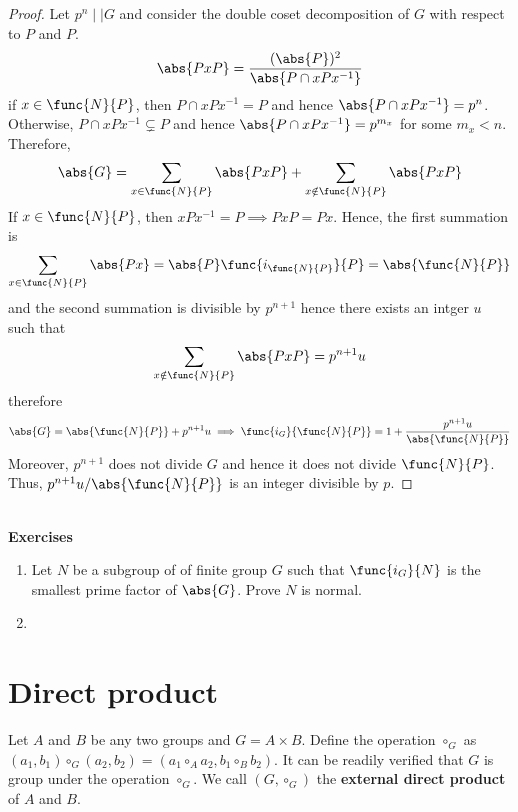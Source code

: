 \begin{proof}
    Let  \(p^n \mid\mid G\) and consider the double coset decomposition of \(G\) with respect to \(P\) and \(P\). 
    \begin{equation*}
        \abs{PxP} = \dfrac{(\abs{P})^2}{\abs{P \cap xPx^{-1}}}
    \end{equation*}
    if \(x \in \func{N}{P}\), then \(P \cap xPx^{-1} = P\) and hence \(\abs{P \cap xPx^{-1}} = p^n\). Otherwise, \(P \cap xPx^{-1} \subsetneq P\) and hence \(\abs{P \cap xPx^{-1}} = p^{m_x}\) for some \(m_x < n\). Therefore, 
    \begin{align*}
        \abs{G} = \sum_{x \in \func{N}{P}} \abs{PxP}  + \sum_{x \notin \func{N}{P}} \abs{PxP} 
    \end{align*}
    If \(x \in \func{N}{P}\), then \(xPx^{-1} = P \implies PxP = Px\). Hence, the first summation is 
    \begin{equation*}
        \sum_{x \in \func{N}{P}} \abs{Px}  = \abs{P} \func{i_{\func{N}{P}}}{P} = \abs{\func{N}{P}}
    \end{equation*}
    and the second summation is divisible by \(p^{n+1}\) hence there exists an intger \(u\) such that
    \begin{equation*}
        \sum_{x \notin \func{N}{P}} \abs{PxP} = p^{n+1}u
    \end{equation*}
    therefore 
    \begin{align*}
        \abs{G} = \abs{\func{N}{P}} + p^{n+1}u \implies \func{i_G}{\func{N}{P}} = 1 + \dfrac{p^{n+1} u}{ \abs{\func{N}{P}}}
    \end{align*}
    Moreover, \(p^{n+1}\) does not divide \(G\) and hence it does not divide \(\func{N}{P}\). Thus, \(p^{n+1} u /\abs{\func{N}{P}}\) is an integer divisible by 
    \(p\).
\end{proof}
\ \\ 
{\Large{\textbf{Exercises}}}
\begin{enumerate}
    \item Let \(N\) be a subgroup of of finite group \(G\) such that \(\func{i_G}{N}\) is the smallest prime factor of \(\abs{G}\). Prove \(N\) is normal.
    \item 
\end{enumerate}

\section{Direct product}
Let \(A\) and \(B\) be any two groups and \(G = A \times B\). Define the operation \(\circ_G\) as \((a_1,b_1) \circ_G (a_2,b_2) = (a_1\circ_A a_2, b_1 \circ_B b_2)\). It can be readily verified that \(G\) is group under the operation \(\circ_G\). We call \((G,\circ_G)\) the \textbf{external direct product} of \(A\) and \(B\).

